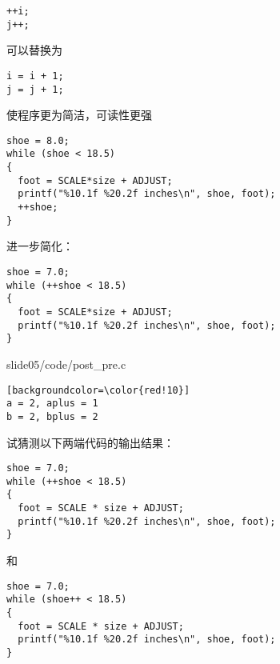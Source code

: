 \begin{frame}[fragile]
\begin{lstlisting}[backgroundcolor=\color{red!10}]
++i;
j++;
\end{lstlisting}
可以替换为
\begin{lstlisting}[backgroundcolor=\color{red!10}]
i = i + 1;
j = j + 1;
\end{lstlisting} \pause 

\end{frame}

\begin{frame}[fragile]

使程序更为简洁，可读性更强

\begin{lstlisting}[backgroundcolor=\color{red!10}]
shoe = 8.0;
while (shoe < 18.5)
{
  foot = SCALE*size + ADJUST;
  printf("%10.1f %20.2f inches\n", shoe, foot);
  ++shoe;
}
\end{lstlisting}
\end{frame}

\begin{frame}[fragile]
进一步简化：
\begin{lstlisting}[backgroundcolor=\color{red!10}]
shoe = 7.0;
while (++shoe < 18.5)
{
  foot = SCALE*size + ADJUST;
  printf("%10.1f %20.2f inches\n", shoe, foot);
}
\end{lstlisting}
\end{frame}

\begin{frame}[fragile]
  
  {slide05/code/post_pre.c}    \pause 

  \begin{lstlisting}[backgroundcolor=\color{red!10}][backgroundcolor=\color{red!10}]
a = 2, aplus = 1
b = 2, bplus = 2
\end{lstlisting}    
\end{frame}



\begin{frame}[fragile]
  试猜测以下两端代码的输出结果：
  \begin{lstlisting}[backgroundcolor=\color{red!10}]
shoe = 7.0;
while (++shoe < 18.5)
{
  foot = SCALE * size + ADJUST;
  printf("%10.1f %20.2f inches\n", shoe, foot);
}
\end{lstlisting}
和
\begin{lstlisting}[backgroundcolor=\color{red!10}]
shoe = 7.0;
while (shoe++ < 18.5)
{
  foot = SCALE * size + ADJUST;
  printf("%10.1f %20.2f inches\n", shoe, foot);
}
\end{lstlisting}
\end{frame}

